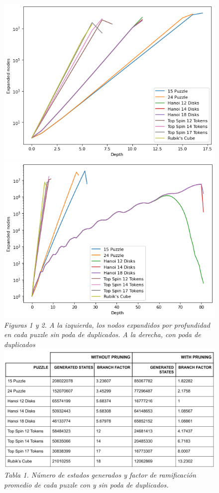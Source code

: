 \documentclass[a4paper,10pt]{article}
\begin{document}
    \begin{figure}[t!]
      \centering
      \includegraphics[scale=0.45]{search_tree/search_tree2.png}
      \includegraphics[scale=0.45]{search_tree/search_tree.png}\\
      \textit{\small{Figuras 1 y 2. A la izquierda, los nodos expandidos por profundidad en
      cada puzzle sin poda de duplicados. A la derecha, con poda de duplicados}}\\
      \includegraphics[scale=0.35]{search_tree/table1.png}\\
      \textit{\small{Tabla 1. N\'umero de estados generados y factor de ramificaci\'on
      promedio de cada puzzle con y sin poda de duplicados.}}
    \end{figure}
    
\end{document}
